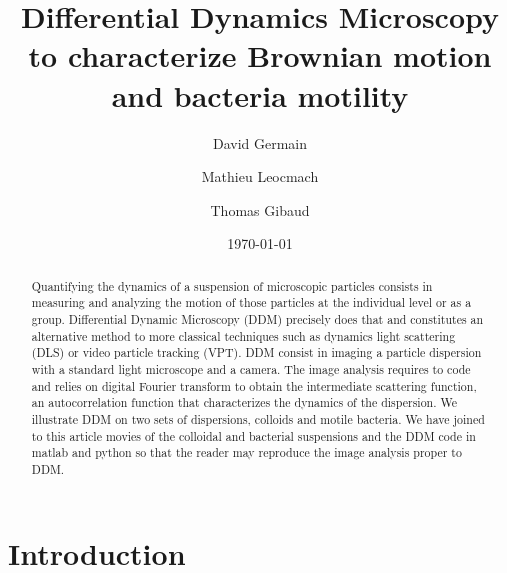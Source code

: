 \documentclass[%
 aip,
 jmp,%
 amsmath,amssymb,
reprint,%
]{revtex4-1}
\begin{document}

\title[Differential Dynamics Microscopy to characterize Brownian motion and bacteria motility]{Differential Dynamics Microscopy\\ to characterize Brownian motion and bacteria motility}%

\author{David Germain}
\author{Mathieu Leocmach}
\author{Thomas Gibaud}

\date{\today}%

\begin{abstract}
Quantifying the dynamics of a suspension of microscopic particles consists in measuring and analyzing the motion of those particles at the individual level or as a group.  Differential Dynamic Microscopy (DDM) precisely does that and constitutes an alternative method to more classical techniques such as dynamics light scattering (DLS) or video particle tracking (VPT). DDM consist in imaging a particle dispersion with a standard light microscope and a camera. The image analysis requires to code and  relies on digital Fourier transform to obtain the intermediate scattering function, an autocorrelation function that characterizes the dynamics of the dispersion. We illustrate DDM on two sets of dispersions, colloids and motile bacteria. We have joined to this article movies of the  colloidal and bacterial suspensions and the DDM code in matlab and python so that the reader may reproduce the image analysis proper to DDM.
\end{abstract}

\maketitle

\section{\label{sec:level1}Introduction}
\end{document}
